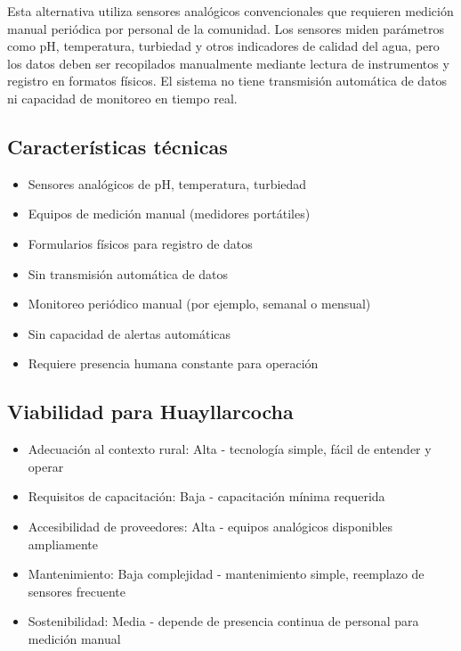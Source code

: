 Esta alternativa utiliza sensores analógicos convencionales que requieren medición manual periódica por personal de la comunidad. Los sensores miden parámetros como pH, temperatura, turbiedad y otros indicadores de calidad del agua, pero los datos deben ser recopilados manualmente mediante lectura de instrumentos y registro en formatos físicos. El sistema no tiene transmisión automática de datos ni capacidad de monitoreo en tiempo real.

\subsection{Características técnicas}
\begin{itemize}
    \item Sensores analógicos de pH, temperatura, turbiedad
    \item Equipos de medición manual (medidores portátiles)
    \item Formularios físicos para registro de datos
    \item Sin transmisión automática de datos
    \item Monitoreo periódico manual (por ejemplo, semanal o mensual)
    \item Sin capacidad de alertas automáticas
    \item Requiere presencia humana constante para operación
\end{itemize}

\subsection{Viabilidad para Huayllarcocha}
\begin{itemize}
    \item Adecuación al contexto rural: Alta - tecnología simple, fácil de entender y operar
    \item Requisitos de capacitación: Baja - capacitación mínima requerida
    \item Accesibilidad de proveedores: Alta - equipos analógicos disponibles ampliamente
    \item Mantenimiento: Baja complejidad - mantenimiento simple, reemplazo de sensores frecuente
    \item Sostenibilidad: Media - depende de presencia continua de personal para medición manual
\end{itemize}


